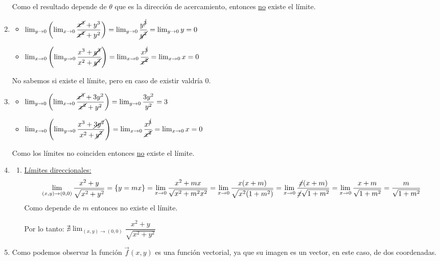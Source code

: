 \begin{enumerate}[label=\color{red}\textbf{\arabic*)}, leftmargin=*]
		Como el resultado depende de $\theta$ que es la dirección de acercamiento, entonces \underline{no} existe el límite.
		
		\item {}
		\begin{itemize}
		\item $\lim_{y\to0}\left(\lim_{x\to0}\dfrac{\cancel{x^3}+y^3}{\cancel{x^2}+y^2}\right)=\lim_{y\to0}\dfrac{y^{\cancel{3}}}{\cancel{y^2}}=\lim_{y\to0}y=0$
		\item $\lim_{x\to0}\left(\lim_{y\to0}\dfrac{x^3+\cancel{y^3}}{x^2+\cancel{y^2}}\right)=\lim_{x\to0}\dfrac{x^{\cancel{3}}}{\cancel{x^2}}=\lim_{x\to0}x=0$
		\end{itemize}
		No sabemos si existe el límite, pero en caso de existir valdría 0.
		\item {}
		\begin{itemize}
		\item $\lim_{y\to0}\left(\lim_{x\to0}\dfrac{\cancel{x^3}+3y^2}{\cancel{x^2}+y^2}\right)=\lim_{y\to0}\dfrac{3y^2}{y^2}=3$
		\item $\lim_{x\to0}\left(\lim_{y\to0}\dfrac{x^3+\cancel{3y^2}}{x^2+\cancel{y^2}}\right)=\lim_{x\to0}\dfrac{x^{\cancel{3}}}{\cancel{x^2}}=\lim_{x\to0}x=0$
		\end{itemize}
		Como los límites no coinciden entonces \underline{no} existe el límite.
		
		\item {}
		\begin{enumerate}[label=\arabic*)]
			\item \underline{Límites direccionales:} \[ \lim_{(x,y)\to(0,0)}\dfrac{x^2+y}{\sqrt{x^2+y^2}}=\left\{y=mx\right\}=\lim_{x\to0}\dfrac{x^2+mx}{\sqrt{x^2+m^2x^2}}=\lim_{x\to0}\dfrac{x(x+m)}{\sqrt{x^2(1+m^2)}}=\lim_{x\to0}\dfrac{\cancel{x}(x+m)}{\cancel{x}\sqrt{1+m^2}}=\lim_{x\to0}\dfrac{x+m}{\sqrt{1+m^2}}=\dfrac{m}{\sqrt{1+m^2}}\]
			Como depende de $m$ entonces no existe el límite.
			
			Por lo tanto: $\nexists\lim_{(x,y)\to(0,0)}\dfrac{x^2+y}{\sqrt{x^2+y^2}}$
		\end{enumerate}
		\item {}
		Como podemos observar la función $\vec{f}(x,y)$ es una función vectorial, ya que su imagen es un vector, en este caso, de dos coordenadas.
		

\end{enumerate}
